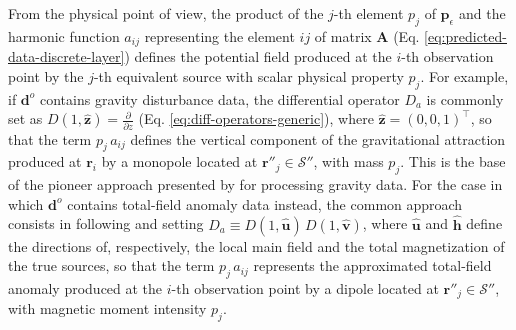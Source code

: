 From the physical point of view, the product of the $j$-th element $p_{j}$ of 
$\mathbf{p}_{\epsilon}$ and the harmonic function $a_{ij}$ representing the element $ij$ of 
matrix $\mathbf{A}$ (Eq. \ref{eq:predicted-data-discrete-layer}) defines the potential 
field produced at the $i$-th observation point by the $j$-th equivalent source with scalar 
physical property $p_{j}$.
For example, if $\mathbf{d}^{o}$ contains gravity disturbance data, the differential operator 
$D_{a}$ is commonly set as $D(1, \hat{\mathbf{z}}) = \tfrac{\partial}{\partial z}$ 
(Eq. \ref{eq:diff-operators-generic}), where $\hat{\mathbf{z}} = (0, 0, 1)^{\top}$, so that 
the term $p_{j} \, a_{ij}$ defines the vertical component of the gravitational attraction
produced at $\mathbf{r}_{i}$ by a monopole located at
$\mathbf{r}''_{j} \in \mathcal{S}''$, with mass $p_{j}$. 
This is the base of the pioneer approach presented by \citep{dampney1969} for processing gravity data.
For the case in which $\mathbf{d}^{o}$ contains total-field anomaly data 
\citep[e.g.,][p. 178]{blakely1996} instead, the common approach consists in
following \citep{emilia1973} and setting $D_{a} \equiv D(1, \hat{\mathbf{u}}) \, D(1, \hat{\mathbf{v}})$, 
where $\hat{\mathbf{u}}$ and $\hat{\mathbf{h}}$ define the directions of, respectively, the local main field and 
the total magnetization of the true sources, so that the term $p_{j} \, a_{ij}$ represents the approximated 
total-field anomaly \citep[e.g.,][p. 179]{blakely1996} produced at the $i$-th observation point by a dipole 
located at $\mathbf{r}''_{j} \in \mathcal{S}''$, with magnetic moment intensity $p_{j}$.